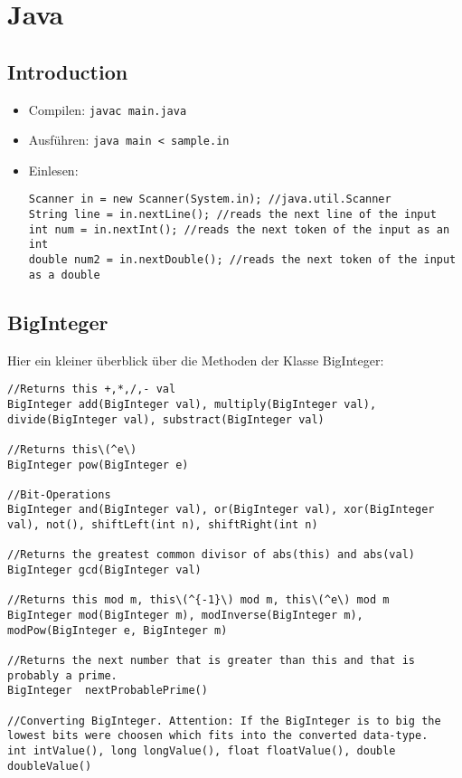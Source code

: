 \section{Java}

\subsection{Introduction}

\begin{itemize}
\item Compilen: \lstinline{javac main.java}
\item Ausführen: \lstinline{java main < sample.in}
\item Einlesen:
\lstset{language=Java}
\begin{lstlisting}
Scanner in = new Scanner(System.in); //java.util.Scanner
String line = in.nextLine(); //reads the next line of the input
int num = in.nextInt(); //reads the next token of the input as an int
double num2 = in.nextDouble(); //reads the next token of the input as a double
\end{lstlisting}
\end{itemize}

\subsection{BigInteger}
Hier ein kleiner überblick über die Methoden der Klasse BigInteger:
\begin{lstlisting}
//Returns this +,*,/,- val
BigInteger add(BigInteger val), multiply(BigInteger val), divide(BigInteger val), substract(BigInteger val)

//Returns this\(^e\)
BigInteger pow(BigInteger e)

//Bit-Operations
BigInteger and(BigInteger val), or(BigInteger val), xor(BigInteger val), not(), shiftLeft(int n), shiftRight(int n)

//Returns the greatest common divisor of abs(this) and abs(val)
BigInteger gcd(BigInteger val)

//Returns this mod m, this\(^{-1}\) mod m, this\(^e\) mod m
BigInteger mod(BigInteger m), modInverse(BigInteger m), modPow(BigInteger e, BigInteger m)

//Returns the next number that is greater than this and that is probably a prime.
BigInteger  nextProbablePrime()

//Converting BigInteger. Attention: If the BigInteger is to big the lowest bits were choosen which fits into the converted data-type.
int intValue(), long longValue(), float floatValue(), double doubleValue() 
\end{lstlisting}
\lstset{language=C++}